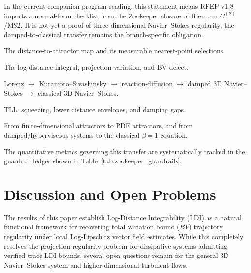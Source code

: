 \documentclass[12pt,a4paper]{article}
\theoremstyle{definition}
\theoremstyle{plain}
\theoremstyle{remark}
\begin{document}
In the current companion-program reading, this statement means RFEP v1.8 imports a
normal-form checklist from the Zookeeper closure of Riemann $C^{(2)}$/MS2.
It is not yet a proof of three-dimensional Navier--Stokes regularity; the
damped-to-classical transfer remains the branch-specific obligation.
\begin{description}[style=nextline,leftmargin=0pt,labelsep=0pt]
  \item[Operator/form.] The distance-to-attractor map and its measurable
  nearest-point selections.
  \item[Defect.] The log-distance integral, projection variation, and BV
  defect.
  \item[Approximation.] Lorenz $\to$ Kuramoto--Sivashinsky $\to$
  reaction-diffusion $\to$ damped 3D Navier--Stokes $\to$ classical
  3D Navier--Stokes.
  \item[Gap.] TLL, squeezing, lower distance envelopes, and damping gaps.
  \item[Limit.] From finite-dimensional attractors to PDE attractors, and
  from damped/hyperviscous systems to the classical $\beta=1$ equation.
\end{description}

The quantitative metrics governing this transfer are systematically tracked in the guardrail ledger shown in Table~\ref{tab:zookeeper_guardrails}.

\section{Discussion and Open Problems}
\label{sec:discussion_open_problems}

The results of this paper establish Log-Distance Integrability (LDI) as a natural functional framework for recovering total variation bound ($BV$) trajectory regularity under local Log-Lipschitz vector field estimates. While this completely resolves the projection regularity problem for dissipative systems admitting verified trace LDI bounds, several open questions remain for the general 3D Navier--Stokes system and higher-dimensional turbulent flows.
\end{document}
